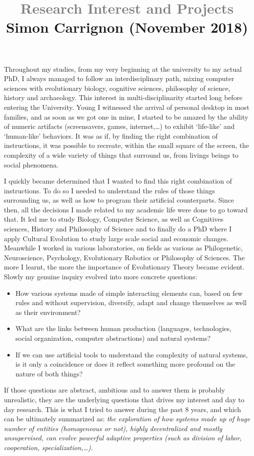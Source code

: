 \documentclass[10pt]{article}
\title{\textcolor{grey}{\Large Research Interest and Projects}\\
\vspace{-.25cm}
{ \normalsize Simon Carrignon (November 2018)}}
\author{}
\date{}
\begin{document}
\maketitle

\vspace{-.5cm}

Throughout my studies, from my very beginning at the university to my actual PhD, I always managed to follow an interdisciplinary path, mixing computer sciences with evolutionary biology, cognitive sciences, philosophy of science, history and archaeology. This interest in multi-disciplinarity started long before entering the University. Young I witnessed the arrival of personal desktop in most families, and as soon as we got one in mine, I started to be amazed by the ability of numeric artifacts (screensavers, games, internet,\ldots) to exhibit ‘life-like’ and ‘human-like’ behaviors. 
It was as if, by finding the right combination of instructions, it was possible to recreate, within the small square of the screen, the complexity of a wide variety of things that surround us, from livings beings to social phenomena.

I quickly became determined that I wanted to find this right combination of instructions. To do so I needed to understand the rules of those things surrounding us, as well as how to program their artificial counterparts.  Since then, all the decisions I made related to my academic life were done to go toward that. It led me to study Biology, Computer Science, as well as Cognitives sciences, History and Philosophy of Science and to finally do a PhD where I apply Cultural Evolution to study large scale social and economic changes. Meanwhile I worked  in various laboratories, on fields as various as Philogenetic, Neuroscience, Psychology, Evolutionary Robotics or Philosophy of Sciences. The more I learnt, the more the importance of Evolutionary Theory became evident. Slowly my genuine inquiry evolved into more concrete questions: 
\begin{itemize}
    \item How various systems made of simple interacting elements can, based on few rules and without supervision, diversify, adapt and change themselves as well as their environment?
    \item What are the links between human production (languages, technologies, social organization, computer abstractions) and natural systems? 
    \item If we can use artificial tools to understand the complexity of natural systems, is it only a coincidence or does it reflect something more profound on the nature of both things?
\end{itemize}
If those questions are abstract, ambitious and to answer them is probably unrealistic, they are the underlying questions that drives my interest and day to day research. This is what I tried to answer during the past 8 years, and which can be ultimately  summarized as: \emph{the exploration of how systems made up of huge number of entities (homogeneous or not), highly decentralized and mostly unsupervised, can evolve powerful adaptive properties (such as division of labor, cooperation, specialization,\ldots).}
\end{document}
